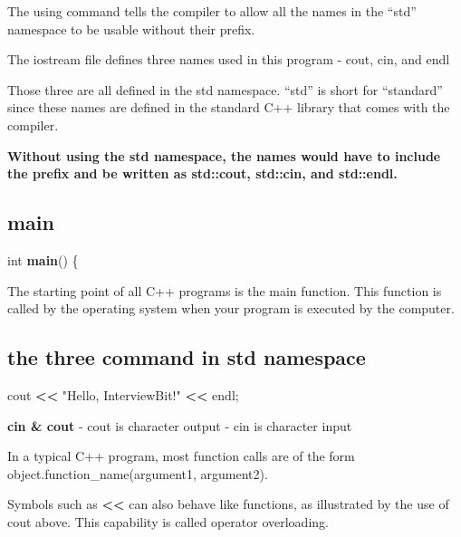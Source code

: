 \documentclass[
]{article}
\newenvironment{Shaded}{\begin{snugshade}}{\end{snugshade}}
\newcommand{\ErrorTok}[1]{\textcolor[rgb]{0.64,0.00,0.00}{\textbf{#1}}}
\newcommand{\FunctionTok}[1]{\textcolor[rgb]{0.13,0.29,0.53}{\textbf{#1}}}
\newcommand{\NormalTok}[1]{#1}
\newcommand{\SpecialCharTok}[1]{\textcolor[rgb]{0.81,0.36,0.00}{\textbf{#1}}}
\newcommand{\StringTok}[1]{\textcolor[rgb]{0.31,0.60,0.02}{#1}}
\begin{document}
The using command tells the compiler to allow all the names in the
``std'' namespace to be usable without their prefix.

The iostream file defines three names used in this program - cout, cin,
and endl

Those three are all defined in the std namespace. ``std'' is short for
``standard'' since these names are defined in the standard C++ library
that comes with the compiler.

\textbf{Without using the std namespace, the names would have to include
the prefix and be written as std::cout, std::cin, and std::endl.}

\subsection{main}\label{main}

\begin{Shaded}
\begin{Highlighting}[]
\NormalTok{int }\FunctionTok{main}\NormalTok{()  \{}
\end{Highlighting}
\end{Shaded}

The starting point of all C++ programs is the main function. This
function is called by the operating system when your program is executed
by the computer.

\subsection{the three command in std
namespace}\label{the-three-command-in-std-namespace}

\begin{Shaded}
\begin{Highlighting}[]
\NormalTok{cout }\SpecialCharTok{\textless{}}\ErrorTok{\textless{}} \StringTok{"Hello, InterviewBit!"} \SpecialCharTok{\textless{}}\ErrorTok{\textless{}}\NormalTok{ endl;}
\end{Highlighting}
\end{Shaded}

\textbf{cin \& cout} - cout is character output - cin is character input

In a typical C++ program, most function calls are of the form
object.function\_name(argument1, argument2).

Symbols such as \textbf{\textless\textless{}} can also behave like
functions, as illustrated by the use of cout above. This capability is
called operator overloading.
\end{document}
